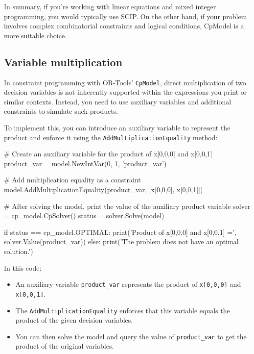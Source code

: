 \begin{airesult}
\vsp

In summary, if you're working with linear equations and mixed integer
programming, you would typically use SCIP. On the other hand, if your problem
involves complex combinatorial constraints and logical conditions, CpModel is a
more suitable choice.
\end{airesult}


\subsection{Variable multiplication}

In constraint programming with OR-Tools' \verb|CpModel|, direct multiplication
of two decision variables is not inherently supported within the expressions you
print or similar contexts. Instead, you need to use auxiliary variables and
additional constraints to simulate such products.

To implement this, you can introduce an auxiliary variable to represent the
product and enforce it using the \verb|AddMultiplicationEquality| method:

\vsp

\begin{python}
# Create an auxiliary variable for the product of x[0,0,0] and x[0,0,1]
product_var = model.NewIntVar(0, 1, 'product_var')

# Add multiplication equality as a constraint
model.AddMultiplicationEquality(product_var, [x[0,0,0], x[0,0,1]])

# After solving the model, print the value of the auxiliary product variable
solver = cp_model.CpSolver()
status = solver.Solve(model)

if status == cp_model.OPTIMAL:
  print('Product of x[0,0,0] and x[0,0,1] =', solver.Value(product_var))
else:
  print('The problem does not have an optimal solution.')
\end{python}

\vsp

In this code:

\begin{itemize}
    \item An auxiliary variable \verb|product_var| represents the product of
\verb|x[0,0,0]| and \verb|x[0,0,1]|.
    \item The \verb|AddMultiplicationEquality| enforces that this variable
equals the product of the given decision variables.
    \item You can then solve the model and query the value of \verb|product_var|
to get the product of the original variables.
\end{itemize}

